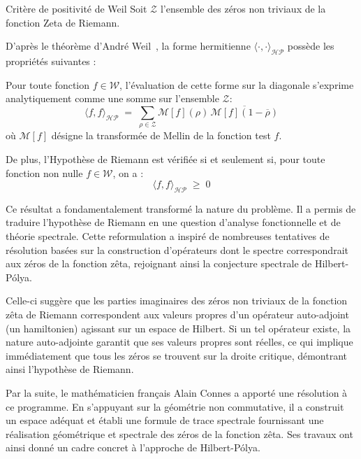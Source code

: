 \documentclass[Riemann_Hypothesis.tex]{subfiles}
\begin{document}
\begin{proposition}[label=pr:CriterePositiviteWeil_fr_intro]{Critère de positivité de Weil}
    Soit $\mathcal{Z}$ l'ensemble des zéros non triviaux de
    la fonction Zeta de Riemann.\par
    D'après le théorème d'André Weil~\cite{weil1952_formules}, 
    la forme hermitienne $\langle \cdot, \cdot \rangle_{\mathcal{HP}}$ 
    possède les propriétés suivantes : \par
    Pour toute fonction $f \in \mathcal{W}$, l'évaluation de cette forme sur la
    diagonale s'exprime analytiquement comme une somme sur l'ensemble
    $\mathcal{Z}$:
    \begin{equation*}
        \langle f, f \rangle_{\mathcal{HP}} \;=\; \sum_{\rho \in \mathcal{Z}} \mathcal{M}[f](\rho) \, \overline{\mathcal{M}[f](1 - \overline{\rho})}
    \end{equation*}
    où $\mathcal{M}[f]$ désigne la transformée de Mellin de la fonction test $f$. \par
    De plus, l'Hypothèse de Riemann est vérifiée si et seulement si, pour toute fonction 
    non nulle $f \in \mathcal{W}$, on a :
    \begin{equation*}
        \langle f, f \rangle_{\mathcal{HP}} \;\geq\; 0
    \end{equation*}
\end{proposition}

Ce résultat a fondamentalement transformé la nature du problème. 
Il a permis de traduire l'hypothèse de Riemann en une question d'analyse 
fonctionnelle et de théorie spectrale. Cette reformulation a inspiré de 
nombreuses tentatives de résolution basées sur la construction d'opérateurs 
dont le spectre correspondrait aux zéros de la fonction zêta, rejoignant 
ainsi la conjecture spectrale de Hilbert-Pólya.\medskip\par

Celle-ci suggère que les parties imaginaires des zéros non triviaux de la fonction 
zêta de Riemann correspondent aux valeurs propres d'un opérateur auto-adjoint 
(un hamiltonien) agissant sur un espace de Hilbert. Si un tel opérateur existe, 
la nature auto-adjointe garantit que ses valeurs propres sont réelles, ce qui 
implique immédiatement que tous les zéros se trouvent sur la droite critique, 
démontrant ainsi l'hypothèse de Riemann.

Par la suite, le mathématicien français Alain Connes a apporté une résolution 
à ce programme. En s'appuyant sur la géométrie non commutative, 
il a construit un espace adéquat et établi une formule de trace spectrale 
fournissant une réalisation géométrique et spectrale des zéros de la fonction zêta. 
Ses travaux ont ainsi donné un cadre concret à l'approche de Hilbert-Pólya.
\end{document}
